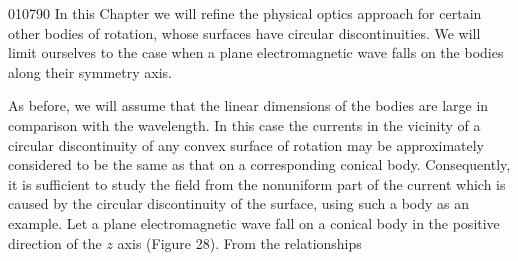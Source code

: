 \begin{scanpage}{0107}{90}
In this Chapter we will refine the physical optics approach for certain other bodies of rotation, whose surfaces have circular discontinuities. We will limit ourselves to the case when a plane electromagnetic wave falls on the bodies along their symmetry axis.

As before, we will assume that the linear dimensions of the bodies are large in comparison with the wavelength. In this case the currents in the vicinity of a circular discontinuity of any convex surface of rotation may be approximately considered to be the same as that on a corresponding conical body. Consequently, it is sufficient to study the field from the nonuniform part of the current which is caused by the circular discontinuity of the surface, using such a body as an example.
Let a plane electromagnetic wave fall on a conical body in the positive direction of the $z$ axis (Figure 28). From the relationships
\end{scanpage}

